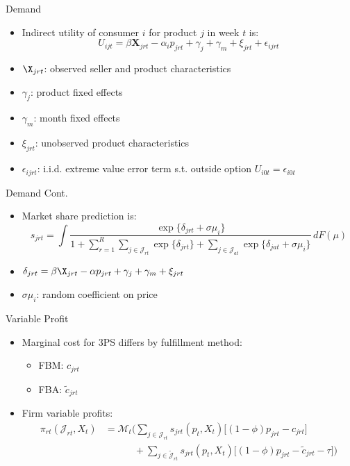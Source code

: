 \documentclass[aspectratio=169,professionalfonts]{beamer}
\newcommand{\beq}[1]{\begin{equation}\label{#1}}
\newcommand{\eeq}{\end{equation}}
\begin{document}
\begin{frame}{Demand}
  \begin{itemize}
    \item Indirect utility of consumer $i$ for product $j$ in week $t$ is:
    \beq{eq:utility}
    U_{ijt} = \beta\textbf{X}_{jrt} - \alpha_ip_{jrt} + \gamma_j + \gamma_m + \xi_{jrt} + \epsilon_{ijrt}
    \eeq
    \item $\X_{jrt}$: observed seller and product characteristics
    \item $\gamma_j$: product fixed effects
    \item $\gamma_m$: month fixed effects
    \item $\xi_{jrt}$: unobserved product characteristics
    \item $\epsilon_{ijrt}$: i.i.d. extreme value error term s.t. outside option $U_{i0t} = \epsilon_{i0t}$
  \end{itemize}
\end{frame}

\begin{frame}{Demand Cont.}
  \begin{itemize}
    \item Market share prediction is:
    \beq{eq:share}
      s_{jrt}
      = \int
      \frac{
        \exp\{\delta_{jrt} + \sigma \mu_i\}
      }{
        1
        + \sum_{r = 1}^R \sum_{j \in \mathcal{J}_{rt}} \exp\{\delta_{jrt}\}
        + \sum_{j \in \mathcal{J}_{at}} \exp\{\delta_{jat} + \sigma \mu_i\}
      } \, dF(\mu)
    \eeq
    \item $\delta_{jrt} = \beta\X_{jrt} - \alpha p_{jrt} + \gamma_j + \gamma_m + \xi_{jrt}$
    \item $\sigma\mu_i$: random coefficient on price
  \end{itemize}
\end{frame}

\begin{frame}{Variable Profit}
  \begin{itemize}
    \item Marginal cost for 3PS differs by fulfillment method:
    \begin{itemize}
      \item FBM: $c_{jrt}$
      \item FBA: $\tilde{c}_{jrt}$
    \end{itemize}
    \item Firm variable profits:
    \begin{align}
      \pi_{rt}(\mathcal{J}_{rt}, X_t)
      &= \mathcal{M}_t \Bigg(
        \sum_{j\in\mathcal{J}_{rt}} s_{jrt}(p_t, X_t)\big[(1-\phi)p_{jrt} - c_{jrt}\big] \\
      &\qquad\quad
        + \sum_{j\in\tilde{\mathcal{J}}_{rt}} s_{jrt}(p_t, X_t)\big[(1-\phi)p_{jrt} - \tilde{c}_{jrt} - \tau\big]
      \Bigg)
    \end{align}
  \end{itemize}
\end{frame}
\end{document}
